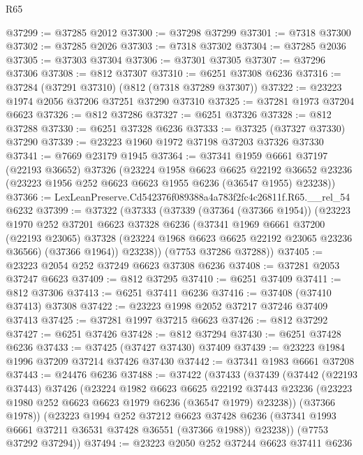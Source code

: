 \begin{lexlean}{R65}
\begin{coremodule}
{@37299 := @37285 @2012
@37300 := @37298 @37299
@37301 := @7318 @37300
@37302 := @37285 @2026
@37303 := @7318 @37302
@37304 := @37285 @2036
@37305 := @37303 @37304
@37306 := @37301 @37305
@37307 := @37296 @37306
@37308 := @812 @37307
@37310 := @6251 @37308 @6236
@37316 := @37284 (@37291 @37310) (@812 (@7318 @37289 @37307))
@37322 := @23223 @1974 @2056 @37206 @37251 @37290 @37310
@37325 := @37281 @1973 @37204 @6623
@37326 := @812 @37286
@37327 := @6251 @37326
@37328 := @812 @37288
@37330 := @6251 @37328 @6236
@37333 := @37325 (@37327 @37330) @37290
@37339 := @23223 @1960 @1972 @37198 @37203 @37326 @37330
@37341 := @7669 @23179 @1945
@37364 := @37341
    @1959
    @6661
    @37197
    (@22193 @36652)
    @37326
    (@23224
      @1958
      @6623
      @6625
      @22192
      @36652
      @23236
      (@23223 @1956 @252 @6623 @6623 @1955 @6236 (@36547 @1955) @23238))
@37366 := LexLeanPreserve.Cd542376f089388a4a783f2fc4c26811f.R65.__rel_54 @6232
@37399 := @37322
    (@37333
      (@37339
        (@37364 (@37366 @1954))
        (@23223
          @1970
          @252
          @37201
          @6623
          @37328
          @6236
          (@37341
            @1969
            @6661
            @37200
            (@22193 @23065)
            @37328
            (@23224 @1968 @6623 @6625 @22192 @23065 @23236 @36566)
            (@37366 @1964))
          @23238))
      (@7753 @37286 @37288))
@37405 := @23223 @2054 @252 @37249 @6623 @37308 @6236
@37408 := @37281 @2053 @37247 @6623
@37409 := @812 @37295
@37410 := @6251 @37409
@37411 := @812 @37306
@37413 := @6251 @37411 @6236
@37416 := @37408 (@37410 @37413) @37308
@37422 := @23223 @1998 @2052 @37217 @37246 @37409 @37413
@37425 := @37281 @1997 @37215 @6623
@37426 := @812 @37292
@37427 := @6251 @37426
@37428 := @812 @37294
@37430 := @6251 @37428 @6236
@37433 := @37425 (@37427 @37430) @37409
@37439 := @23223 @1984 @1996 @37209 @37214 @37426 @37430
@37442 := @37341 @1983 @6661 @37208
@37443 := @24476 @6236
@37488 := @37422
    (@37433
      (@37439
        (@37442
          (@22193 @37443)
          @37426
          (@23224
            @1982
            @6623
            @6625
            @22192
            @37443
            @23236
            (@23223 @1980 @252 @6623 @6623 @1979 @6236 (@36547 @1979) @23238))
          (@37366 @1978))
        (@23223
          @1994
          @252
          @37212
          @6623
          @37428
          @6236
          (@37341 @1993 @6661 @37211 @36531 @37428 @36551 (@37366 @1988))
          @23238))
      (@7753 @37292 @37294))
@37494 := @23223 @2050 @252 @37244 @6623 @37411 @6236
}
\end{coremodule}
\end{lexlean}
